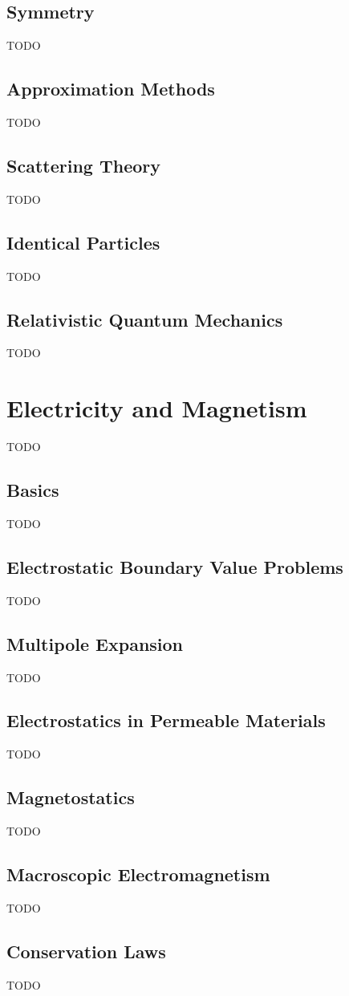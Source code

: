 \documentclass[12pt]{article}
\begin{document}
\subsection{Symmetry}
TODO
\subsection{Approximation Methods}
TODO
\subsection{Scattering Theory}
TODO
\subsection{Identical Particles}
TODO
\subsection{Relativistic Quantum Mechanics}
TODO



\section{Electricity and Magnetism}
TODO
\subsection{Basics}
TODO
\subsection{Electrostatic Boundary Value Problems}
TODO
\subsection{Multipole Expansion}
TODO
\subsection{Electrostatics in Permeable Materials}
TODO
\subsection{Magnetostatics}
TODO
\subsection{Macroscopic Electromagnetism}
TODO
\subsection{Conservation Laws}
TODO
\end{document}
